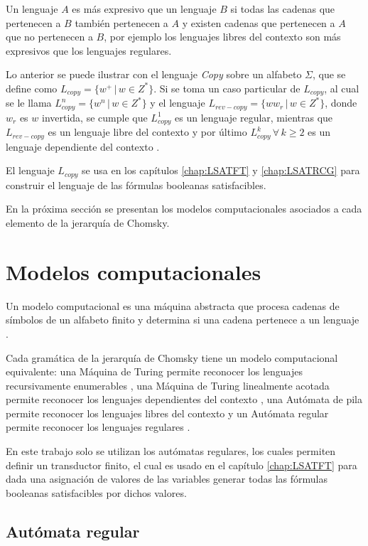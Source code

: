 \documentclass[12pt]{article}
\begin{document}
Un lenguaje $A$ es más expresivo que un lenguaje $B$ si todas las cadenas que pertenecen a $B$ también pertenecen a $A$ y existen cadenas 
que pertenecen a $A$ que no pertenecen a $B$, por ejemplo los lenguajes libres del contexto son más expresivos que los lenguajes regulares. 

Lo anterior se puede ilustrar con el lenguaje \textit{Copy} sobre un alfabeto 
$\Sigma$, que se define como $L_{copy}=\{w^+\,|\,w\in Z^*\}$.  
Si se toma un caso particular de $L_{copy}$, al cual se le llama $L_{copy}^n=\{w^n\,|\,w\in Z^*\}$ y 
el lenguaje $L_{rev-copy}=\{ww_r\,|\,w\in Z^*\}$, donde $w_r$ es $w$ invertida, se cumple que $L_{copy}^1$
es un lenguaje regular, mientras que $L_{rev-copy}$ es un lenguaje libre del contexto y por último 
$L_{copy}^k\,\forall\,k\geq 2$ es un lenguaje dependiente del contexto \cite{authomataTheory}.  

El lenguaje $L_{copy}$ se usa en los  capítulos \ref{chap:LSATFT} y \ref{chap:LSATRCG} para construir el lenguaje de las fórmulas booleanas satisfacibles.

En la próxima sección se presentan los modelos computacionales asociados a cada elemento de la jerarquía de Chomsky.
\section{Modelos computacionales}

Un modelo computacional es una máquina abstracta que procesa cadenas de símbolos de un alfabeto finito y 
determina si una cadena pertenece a un lenguaje \cite{authomataTheory}. 

Cada gramática de la jerarquía de Chomsky tiene un modelo computacional equivalente: una Máquina de Turing 
permite reconocer los lenguajes recursivamente enumerables \cite{authomataTheory}, una Máquina de Turing linealmente acotada permite
reconocer los lenguajes dependientes del contexto \cite{authomataTheory}, una Autómata de pila permite reconocer 
los lenguajes libres del contexto \cite{authomataTheory} y un Autómata regular permite reconocer los lenguajes regulares \cite{authomataTheory}.

En este trabajo solo se utilizan los autómatas regulares, los cuales permiten definir un transductor finito, el cual es 
usado en el capítulo \ref{chap:LSATFT} para dada una asignación de valores de las variables generar todas las fórmulas
booleanas satisfacibles por dichos valores.

\subsection{Autómata regular}
\end{document}
